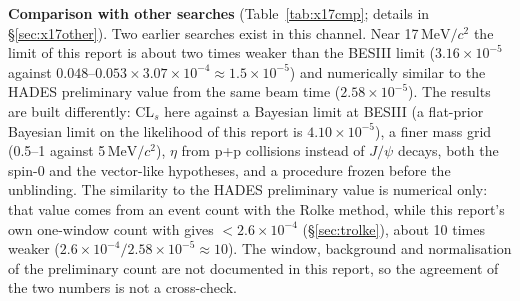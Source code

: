 \documentclass[11pt,a4paper]{article}
\newcommand{\MeVcc}{\ensuremath{\mathrm{MeV}/c^{2}}\xspace}
\newcommand{\code}[1]{\texttt{\detokenize{#1}}}
\begin{document}
\textbf{Comparison with other searches} (Table~\ref{tab:x17cmp}; details in \S\ref{sec:x17other}). Two earlier searches exist in this channel.
Near 17\,\MeVcc the limit of this report is about two times weaker than the BESIII limit ($3.16\times10^{-5}$ against
$0.048$--$0.053\times3.07\times10^{-4}\approx1.5\times10^{-5}$) and numerically similar to the HADES preliminary value from the same beam time
($2.58\times10^{-5}$). The results are built differently: CL$_s$ here against a Bayesian limit at BESIII (a flat-prior Bayesian limit on the
likelihood of this report is $4.10\times10^{-5}$), a finer mass grid (0.5--1 against 5\,\MeVcc), $\eta$ from p+p collisions instead of $J/\psi$
decays, both the spin-0 and the vector-like hypotheses, and a procedure frozen before the unblinding. The similarity to the HADES preliminary
value is numerical only: that value comes from an event count with the Rolke method, while this report's own one-window count with
\code{TRolke} gives $<2.6\times10^{-4}$ (\S\ref{sec:trolke}), about 10 times weaker ($2.6\times10^{-4}/2.58\times10^{-5}\approx10$). The window,
background and normalisation of the preliminary count are not documented in this report, so the agreement of the two numbers is not a
cross-check.
\end{document}
